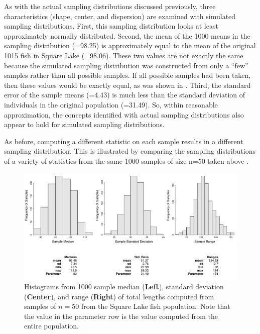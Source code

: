 \documentclass[10pt,openany]{book}\usepackage[]{graphicx}\usepackage[]{color}
\newenvironment{knitrout}{}{} %
\begin{document}
As with the actual sampling distributions discussed previously, three characteristics (shape, center, and dispersion) are examined with simulated sampling distributions.  First, this sampling distribution looks at least approximately normally distributed.  Second, the mean of the 1000 means in the sampling distribution (=98.25) is approximately equal to the mean of the original 1015 fish in Square Lake (=98.06).  These two values are not exactly the same because the simulated sampling distribution was constructed from only a ``few'' samples rather than all possible samples.  If all possible samples had been taken, then these values would be exactly equal, as was shown in .  Third, the standard error of the sample means (=4.43) is much less than the standard deviation of individuals in the original population (=31.49).  So, within reasonable approximation, the concepts identified with actual sampling distributions also appear to hold for simulated sampling distributions.

As before, computing a different statistic on each sample results in a different sampling distribution.  This is illustrated by comparing the sampling distributions of a variety of statistics from the same 1000 samples of size n=50 taken above .

\begin{knitrout}
\color{fgcolor}\begin{figure}[hbtp]

{\centering \includegraphics[width=.95\linewidth]{Figs/SampDistSLOther50-1} 

}

\caption[Histograms from 1000 sample median (\textbf{Left}), standard deviation (\textbf{Center}), and range (\textbf{Right}) of total lengths computed from samples of $n=50$ from the Square Lake fish population]{Histograms from 1000 sample median (\textbf{Left}), standard deviation (\textbf{Center}), and range (\textbf{Right}) of total lengths computed from samples of $n=50$ from the Square Lake fish population.  Note that the value in the parameter row is the value computed from the entire population.}\label{fig:SampDistSLOther50}
\end{figure}


\end{knitrout}
\end{document}
